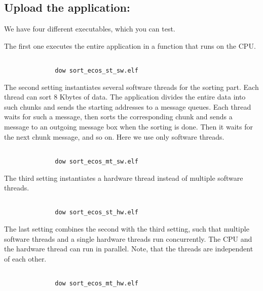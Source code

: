 \documentclass[DIV15,a4paper]{scrartcl}
\begin{document}
\subsection*{Upload the application:}

We have four different executables, which you can test.

    The first one executes the entire application in a function that runs on the CPU.

\begin{verbatim}
    
              dow sort_ecos_st_sw.elf

\end{verbatim}    
              
    The second setting instantiates several software threads for the sorting part. Each thread can sort 8 Kbytes of data. 
The application divides the entire data into such chunks and sends the starting addresses to a message queues. Each thread waits for such a message, 
then sorts the corresponding chunk and sends a message to an outgoing message box when the sorting is done. Then it waits for the next chunk message, and so on. Here we use only software threads.

\begin{verbatim}
    
              dow sort_ecos_mt_sw.elf

\end{verbatim}
              
    The third setting instantiates a hardware thread instead of multiple software threads.

\begin{verbatim}
    
              dow sort_ecos_st_hw.elf

\end{verbatim}
              
    The last setting combines the second with the third setting, such that multiple software threads and a single hardware threads run concurrently. 
The CPU and the hardware thread can run in parallel. Note, that the threads are independent of each other.

\begin{verbatim}
    
              dow sort_ecos_mt_hw.elf

\end{verbatim}
\end{document}
